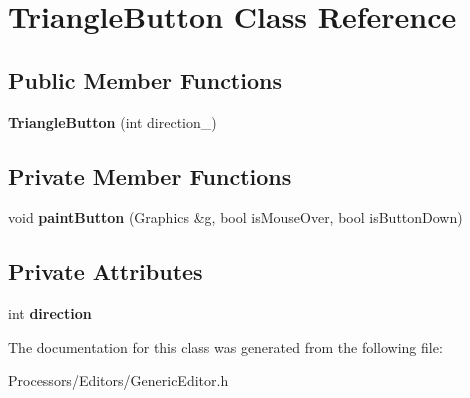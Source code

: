 \hypertarget{classTriangleButton}{\section{Triangle\-Button Class Reference}
\label{classTriangleButton}
}
\subsection*{Public Member Functions}
\begin{DoxyCompactItemize}
\item 
\hypertarget{classTriangleButton_a91e0ca3f1db5448686b2ed45f5cdf21b}{{\bfseries Triangle\-Button} (int direction\-\_\-)}\label{classTriangleButton_a91e0ca3f1db5448686b2ed45f5cdf21b}

\end{DoxyCompactItemize}
\subsection*{Private Member Functions}
\begin{DoxyCompactItemize}
\item 
\hypertarget{classTriangleButton_a396bef56f305e84b677537c4343ed96b}{void {\bfseries paint\-Button} (Graphics \&g, bool is\-Mouse\-Over, bool is\-Button\-Down)}\label{classTriangleButton_a396bef56f305e84b677537c4343ed96b}

\end{DoxyCompactItemize}
\subsection*{Private Attributes}
\begin{DoxyCompactItemize}
\item 
\hypertarget{classTriangleButton_ad9a2fa34e8e4c171bfb0f03d67d7aae6}{int {\bfseries direction}}\label{classTriangleButton_ad9a2fa34e8e4c171bfb0f03d67d7aae6}

\end{DoxyCompactItemize}


The documentation for this class was generated from the following file\-:\begin{DoxyCompactItemize}
\item 
Processors/\-Editors/Generic\-Editor.\-h\end{DoxyCompactItemize}
